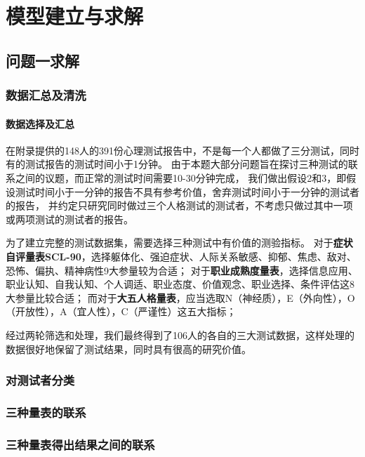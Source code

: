 \documentclass[withoutpreface,bwprint]{cumcmthesis} %
\begin{document}
\section{模型建立与求解}

\subsection{问题一求解}

\subsubsection{数据汇总及清洗}
\paragraph*{数据选择及汇总}
在附录提供的148人的391份心理测试报告中，不是每一个人都做了三分测试，同时有的测试报告的测试时间小于1分钟。
由于本题大部分问题旨在探讨三种测试的联系之间的议题，而正常的测试时间需要10-30分钟完成\cite{SCL-90}\cite{The Career Development Quarterly}\cite{The Big Five trait taxonomy}，
我们做出假设2和3，即假设测试时间小于一分钟的报告不具有参考价值，舍弃测试时间小于一分钟的测试者的报告，
并约定只研究同时做过三个人格测试的测试者，不考虑只做过其中一项或两项测试的测试者的报告。

为了建立完整的测试数据集，需要选择三种测试中有价值的测验指标。
对于\textbf{症状自评量表SCL-90}，选择躯体化、强迫症状、人际关系敏感、抑郁、焦虑、敌对、恐怖、偏执、精神病性9大参量较为合适；
对于\textbf{职业成熟度量表}，选择信息应用、职业认知、自我认知、个人调适、职业态度、价值观念、职业选择、条件评估这8大参量比较合适；
而对于\textbf{大五人格量表}，应当选取N（神经质），E（外向性），O（开放性），A（宜人性），C（严谨性）这五大指标；

经过两轮筛选和处理，我们最终得到了106人的各自的三大测试数据，这样处理的数据很好地保留了测试结果，同时具有很高的研究价值。


\subsubsection{对测试者分类}


\subsubsection{三种量表的联系}

\subsubsection{三种量表得出结果之间的联系}
\end{document}
